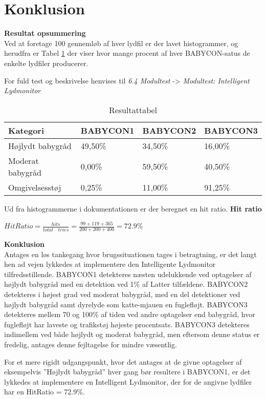 \section{Konklusion}

\textbf{Resultat opsummering}\\
Ved at foretage 100 gennemløb af hver lydfil er der lavet histogrammer, og herudfra er Tabel \ref{IL:result} der viser hvor mange procent af hver BABYCON-satus de enkelte lydfiler producerer. 

For fuld test og beskrivelse henvises til \textit{6.4 Modultest} -> \textit{Modultest: Intelligent Lydmonitor}

\begin{table}[!htbp] \centering
	\caption{Resultattabel}
	\label{IL:result}
	\begin{tabular}{|l|l|l|l|}
	\hline
		\textbf{Kategori} & \textbf{BABYCON1} & \textbf{BABYCON2} & \textbf{BABYCON3}\\\hline
		Højlydt babygråd & 49,50\% & 34,50\% & 16,00\% \\\hline
		Moderat babygråd & 0,00\% & 59,50\% & 40,50\% \\\hline
		Omgivelsesstøj & 0,25\% & 11,00\% & 91,25\% \\\hline
	\end{tabular}
\end{table}

Ud fra histogrammerne i dokumentationen er der beregnet en hit ratio. 
\textbf{Hit ratio}\\
\begin{center}
$HitRatio=\frac { hits }{ total\quad tries } =\frac { 99+119+365 }{ 200+200+400 } =72.9$\%
\end{center}

\textbf{Konklusion}\\
Antages en løs tankegang hvor brugssituationen tages i betragtning, er det langt hen ad
vejen lykkedes at implementere den Intelligente Lydmonitor tilfredsstillende. BABYCON1
detekteres næsten udelukkende ved optagelser af højlydt babygråd med en detektion ved
1\% af Latter tilfældene. BABYCON2 detekteres i højest grad ved moderat babygråd, med
en del detektioner ved højlydt babygråd samt dyrelyde som katte-mjauen en fuglefløjt.
BABYCON3 detekteres mellem 70 og 100\% af tiden ved andre optagelser end babygråd,
hvor fuglefløjt har laveste og trafikstøj højeste procentsats. BABYCON3 detekteres
indimellem ved både højlydt og moderat babygråd, men eftersom denne status er fredelig,
antages denne fejltagelse for mindre væsentlig.

For et mere rigidt udgangspunkt, hvor det antages at de givne optagelser af eksempelvis
”Højlydt babygråd” hver gang bør resultere i BABYCON1, er det lykkedes at implementere
en Intelligent Lydmonitor, der for de angivne lydfiler har en HitRatio = 72.9\%.


 

